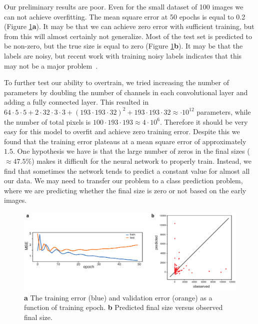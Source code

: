 \documentclass[10pt,twocolumn,letterpaper]{article}
\begin{document}
Our preliminary results are poor.  Even for the small dataset of 100 images we can not achieve overfitting.  The mean square error at 50 epochs is equal to 0.2 (Figure \ref{results}\textbf{a}).  It may be that we can achieve zero error with sufficient training, but from this will almost certainly not generalize.     Most of the test set is predicted to be non-zero, but the true size is equal to zero (Figure \ref{results}\textbf{b}).  It may be that the labels are noisy, but recent work with training noisy labels indicates that this may not be a major problem~\cite{xue2019robust}.

To further test our ability to overtrain, we tried increasing the number of parameters by doubling the number of channels in each convolutional layer and adding a fully connected layer.  This resulted in $64 \cdot 5 \cdot 5 + 2 \cdot 32 \cdot 3 \cdot 3 + (193 \cdot 193 \cdot 32)^2 + 193 \cdot 193 \cdot 32 \approx \cdot 10^{12}$ parameters, while the number of total pixels is $100 \cdot 193 \cdot 193 \approx 4 \cdot 10^{6}$.  Therefore it should be very easy for this model to overfit and achieve zero training error.  Despite this we found that the training error plateaus at a mean square error of approximately $1.5$.  One hypothesis we have is that the large number of zeros in the final sizes ($\approx 47.5 \%$) makes it difficult for the neural network to properly train.  Instead, we find that sometimes the network tends to predict a constant value for almost all our data.  We may need to transfer our problem to a class prediction problem, where we are predicting whether the final size is zero or not based on the early images.  

\begin{figure}[t!]
\begin{center}
 \includegraphics[width=0.8\linewidth]{figures/error_vs_epoch_and_validation_predictions_vs_observed_v2.pdf}
\end{center}
   \caption{\textbf{a} The training error (blue) and validation error (orange) as a function of training epoch.  \textbf{b} Predicted final size versus observed final size.}
\label{results}
\end{figure}
\end{document}

